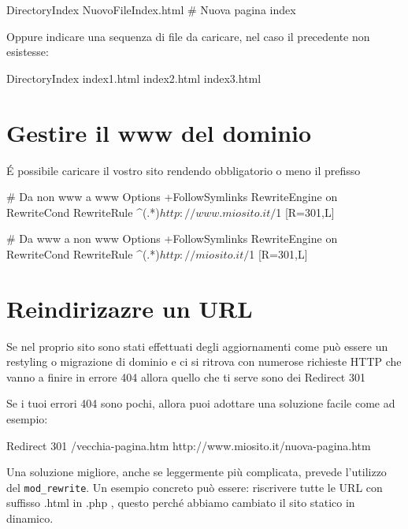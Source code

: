 \begin{code}
DirectoryIndex NuovoFileIndex.html # Nuova pagina index
\end{code}

Oppure indicare una sequenza di file da caricare, nel caso il precedente non esistesse:

\begin{code}
DirectoryIndex index1.html index2.html index3.html 
\end{code}

\section{Gestire il www del dominio}
\'E possibile caricare il vostro sito rendendo obbligatorio o meno il prefisso 

\begin{code}
# Da non www a www
Options +FollowSymlinks
RewriteEngine on
RewriteCond %
RewriteRule ^(.*)$ http://www.miosito.it/$1 [R=301,L]
\end{code}

\begin{code}
# Da www a non www
Options +FollowSymlinks
RewriteEngine on
RewriteCond %
RewriteRule ^(.*)$ http://miosito.it/$1 [R=301,L]
\end{code}

\section{Reindirizazre un URL}

Se nel proprio sito sono stati effettuati degli aggiornamenti come può essere un restyling o migrazione di dominio e ci si ritrova con numerose richieste \ac{HTTP} che vanno a finire in errore 404 allora quello che ti serve sono dei Redirect 301

Se i tuoi errori 404 sono pochi, allora puoi adottare una soluzione facile come ad esempio:

\begin{code}
Redirect 301 /vecchia-pagina.htm http://www.miosito.it/nuova-pagina.htm
\end{code}

Una soluzione migliore, anche se leggermente più complicata, prevede l'utilizzo del \verb|mod_rewrite|. Un esempio concreto può essere: riscrivere tutte le URL con suffisso .html in .php , questo perché abbiamo cambiato il sito statico in  dinamico.

